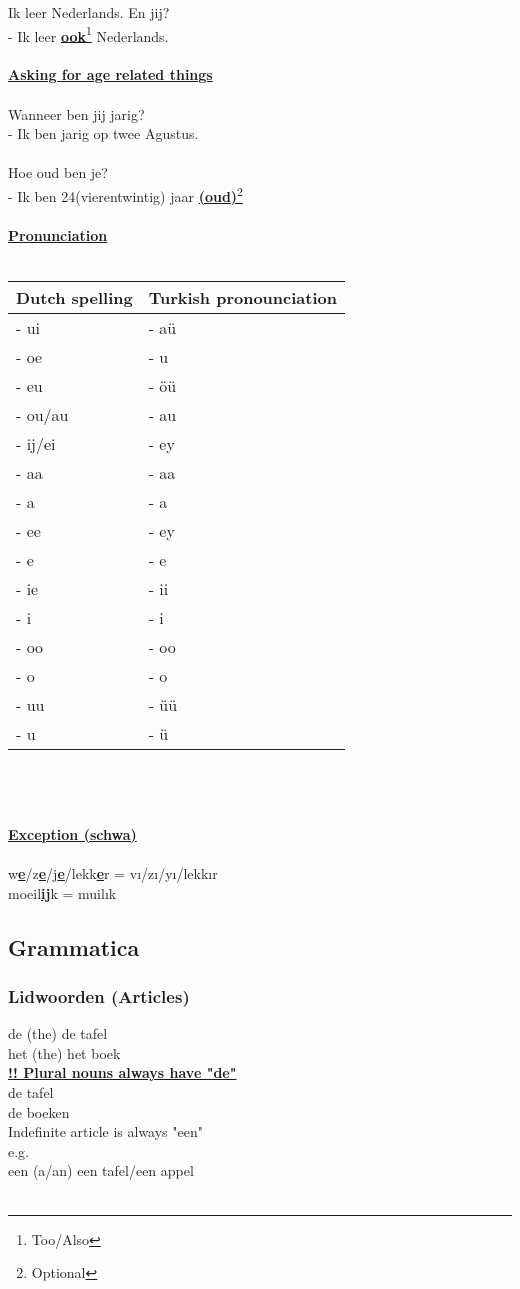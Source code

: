\documentclass[a4paper,14pt]{extarticle}
\newcommand{\optional}[1]{\underline{\textbf{(#1)}}\footnote{Optional}}
\newcommand{\note}[2]{\underline{\textbf{#1}}\footnote{#2}}
\newcommand{\attention}[1]{\underline{\textbf{!! #1}}}
\newcommand{\emp}[1]{\underline{\textbf{#1}}}
\begin{document}
\begin{paracol}{2}
Ik leer Nederlands. En jij? \\
- Ik leer \note{ook}{Too/Also} Nederlands. \\ \\
\emp{Asking for age related things} \\ \\
Wanneer ben jij jarig? \\
- Ik ben jarig op twee Agustus. \\ \\
Hoe oud ben je? \\
- Ik ben 24(vierentwintig) jaar \optional{oud} \\ \\
\emp{Pronunciation} \\ \\
\begin{tabularx}{275pt}{ p{110pt} p{165pt} }
 \hline
 Dutch spelling & Turkish pronounciation \\
 \hline
- ui & - aü \\
- oe & - u \\
- eu & - öü \\
- ou/au & - au \\
- ij/ei & - ey \\
- aa & - aa \\
- a & - a \\
- ee & - ey \\
- e & - e \\
- ie & - ii \\
- i & - i \\
- oo & - oo \\
- o & - o \\
- uu & - üü \\
- u & - ü \\
\end{tabularx} \\ \\ \\
\emp{Exception (schwa)} \\ \\
w\emp{e}/z\emp{e}/j\emp{e}/lekk\emp{e}r = vı/zı/yı/lekkır \\
moeil\emp{ij}k = muilık
\end{paracol}
\newpage
\subsection{Grammatica}
\subsubsection{Lidwoorden (Articles)}
\begin{paracol}{2}
de (the) de tafel \\
het (the) het boek \\
\attention{Plural nouns always have "de"} \\
de tafel \\
de boeken \\
\switchcolumn
Indefinite article is always "een" \\
e.g.\\
een (a/an) een tafel/een appel \\\\
\end{paracol}
\end{document}
